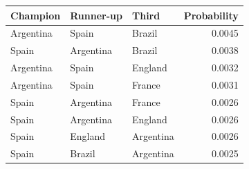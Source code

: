 \begin{tabular}{lllr}
\toprule
Champion & Runner-up & Third & Probability \\
\midrule
Argentina & Spain & Brazil & 0.0045 \\
Spain & Argentina & Brazil & 0.0038 \\
Argentina & Spain & England & 0.0032 \\
Argentina & Spain & France & 0.0031 \\
Spain & Argentina & France & 0.0026 \\
Spain & Argentina & England & 0.0026 \\
Spain & England & Argentina & 0.0026 \\
Spain & Brazil & Argentina & 0.0025 \\
\bottomrule
\end{tabular}

